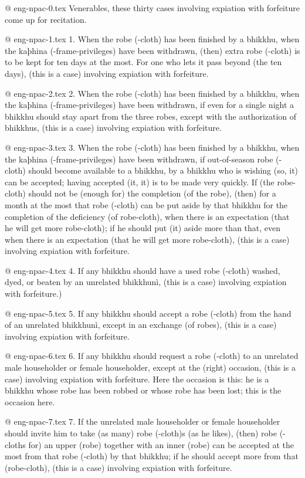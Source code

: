@ eng-npac-0.tex
Venerables, these thirty cases involving expiation with forfeiture come up for recitation.

@ eng-npac-1.tex
1. When the robe (-cloth) has been finished by a bhikkhu, when the kaþhina (-frame-privileges) have been withdrawn, (then) extra robe (-cloth) is to be kept for ten days at the most. For one who lets it pass beyond (the ten days), (this is a case) involving expiation with forfeiture.

@ eng-npac-2.tex
2. When the robe (-cloth) has been finished by a bhikkhu, when the kaþhina (-frame-privileges) have been withdrawn, if even for a single night a bhikkhu should stay apart from the three robes, except with the authorization of bhikkhus, (this is a case) involving expiation with forfeiture.

@ eng-npac-3.tex
3. When the robe (-cloth) has been finished by a bhikkhu, when the kaþhina (-frame-privileges) have been withdrawn, if out-of-season robe (-cloth) should become available to a bhikkhu, by a bhikkhu who is wishing (so, it) can be accepted; having accepted (it, it) is to be made very quickly. If (the robe-cloth) should not be (enough for) the completion (of the robe), (then) for a month at the most that robe (-cloth) can be put aside by that bhikkhu for the completion of the deficiency (of robe-cloth), when there is an expectation (that he will get more robe-cloth); if he should put (it) aside more than that, even when there is an expectation (that he will get more robe-cloth), (this is a case) involving expiation with forfeiture.

@ eng-npac-4.tex
4. If any bhikkhu should have a used robe (-cloth) washed, dyed, or beaten by an unrelated bhikkhunì, (this is a case) involving expiation with forfeiture.)

@ eng-npac-5.tex
5. If any bhikkhu should accept a robe (-cloth) from the hand of an unrelated bhikkhunì, except in an exchange (of robes), (this is a case) involving expiation with forfeiture.

@ eng-npac-6.tex
6. If any bhikkhu should request a robe (-cloth) to an unrelated male householder or female householder, except at the (right) occasion, (this is a case) involving expiation with forfeiture. Here the occasion is this: he is a bhikkhu whose robe has been robbed or whose robe has been lost; this is the occasion here.

@ eng-npac-7.tex
7. If the unrelated male householder or female householder should invite him to take (as many) robe (-cloth)s (as he likes), (then) robe (-cloths for) an upper (robe) together with an inner (robe) can be accepted at the most from that robe (-cloth) by that bhikkhu; if he should accept more from that (robe-cloth), (this is a case) involving expiation with forfeiture.

